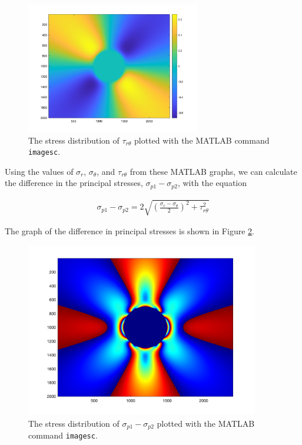 \documentclass[12 pt]{article}
\begin{document}
\begin{figure}[htbp]
\centering
\includegraphics[width=3in]{images/Graphs/tau_rtheta}
\caption{The stress distribution of $\tau_{r\theta}$ plotted with the MATLAB command \texttt{imagesc}.}
\label{fig:tau_rtheta}
\end{figure}

Using the values of $\sigma_r$, $\sigma_\theta$, and $\tau_{r\theta}$ from these MATLAB graphs, we can calculate the difference in the principal stresses, $\sigma_{p1}-\sigma_{p2}$, with the equation

\begin{align}
\sigma_{p1}-\sigma_{p2}=2\sqrt{\left(\frac{\sigma_r-\sigma_\theta}{2}\right)^2+\tau_{r\theta}^2}
\end{align}

The graph of the difference in principal stresses is shown in Figure \ref{fig:principal_stress_diff}.

\begin{figure}[htbp]
\centering
\includegraphics[width=4in]{images/Graphs/principal_stress_diff}
\caption{The stress distribution of $\sigma_{p1}-\sigma_{p2}$ plotted with the MATLAB command \texttt{imagesc}.}
\label{fig:principal_stress_diff}
\end{figure}
\end{document}
